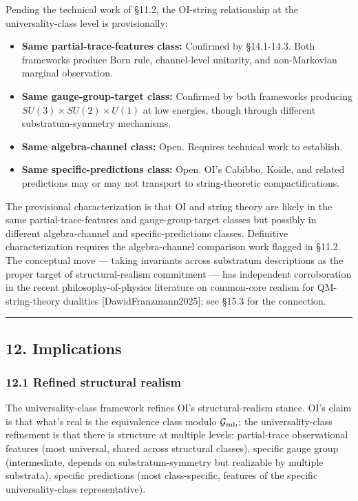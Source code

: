 \documentclass[
]{article}
\providecommand{\tightlist}{%
  \setlength{\itemsep}{0pt}\setlength{\parskip}{0pt}}
\begin{document}
Pending the technical work of §11.2, the OI-string relationship at the
universality-class level is provisionally:

\begin{itemize}
\tightlist
\item
  \textbf{Same partial-trace-features class:} Confirmed by §14.1-14.3.
  Both frameworks produce Born rule, channel-level unitarity, and
  non-Markovian marginal observation.
\item
  \textbf{Same gauge-group-target class:} Confirmed by both frameworks
  producing \(SU(3) \times SU(2) \times U(1)\) at low energies, though
  through different substratum-symmetry mechanisms.
\item
  \textbf{Same algebra-channel class:} Open. Requires technical work to
  establish.
\item
  \textbf{Same specific-predictions class:} Open. OI's Cabibbo, Koide,
  and related predictions may or may not transport to string-theoretic
  compactifications.
\end{itemize}

The provisional characterization is that OI and string theory are likely
in the same partial-trace-features and gauge-group-target classes but
possibly in different algebra-channel and specific-predictions classes.
Definitive characterization requires the algebra-channel comparison work
flagged in §11.2. The conceptual move --- taking invariants across
substratum descriptions as the proper target of structural-realism
commitment --- has independent corroboration in the recent
philosophy-of-physics literature on common-core realism for
QM-string-theory dualities {[}DawidFranzmann2025{]}; see §15.3 for the
connection.

\begin{center}\rule{0.5\linewidth}{0.5pt}\end{center}

\hypertarget{implications}{%
\subsection{12. Implications}\label{implications}}

\hypertarget{refined-structural-realism}{%
\subsubsection{12.1 Refined structural
realism}\label{refined-structural-realism}}

The universality-class framework refines OI's structural-realism stance.
OI's claim is that what's real is the equivalence class modulo
\(\mathcal{G}_{\rm sub}\); the universality-class refinement is that
there is structure at multiple levels: partial-trace observational
features (most universal, shared across structural classes), specific
gauge group (intermediate, depends on substratum-symmetry but realizable
by multiple substrata), specific predictions (most class-specific,
features of the specific universality-class representative).
\end{document}
